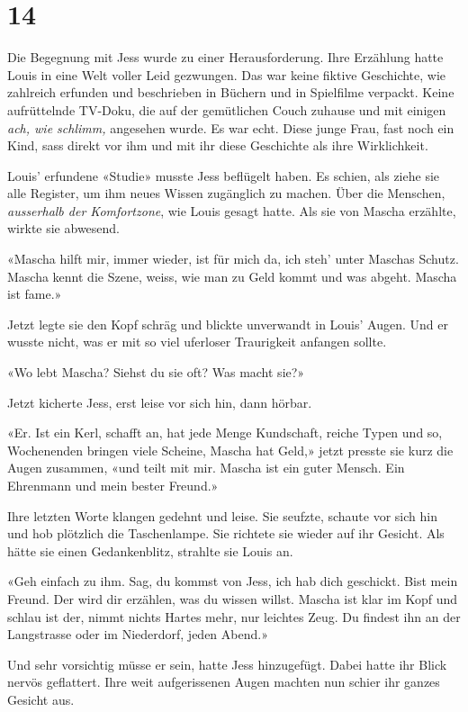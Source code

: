 \chapter{14}



Die Begegnung mit Jess wurde zu einer Herausforderung. Ihre
Erzählung hatte Louis in eine Welt voller Leid gezwungen.
Das war keine fiktive Geschichte, wie zahlreich erfunden und beschrieben
in Büchern und in Spielfilme verpackt. Keine aufrüttelnde TV-Doku, die
auf der gemütlichen Couch zuhause und mit einigen \emph{ach, wie
schlimm,} angesehen wurde. Es war echt. Diese junge Frau, fast noch ein
Kind, sass direkt vor ihm und mit ihr diese Geschichte als ihre Wirklichkeit.

Louis’ erfundene «Studie» musste Jess beflügelt haben. Es schien, als ziehe sie
alle Register, um ihm neues Wissen zugänglich zu machen. Über die
Menschen, \emph{ausserhalb der Komfortzone}, wie Louis gesagt hatte. 
Als sie von Mascha erzählte, wirkte sie abwesend.

«Mascha hilft mir, immer wieder, ist für mich da, ich steh’ unter
Maschas Schutz. Mascha kennt die Szene, weiss, wie man zu Geld kommt und
was abgeht. Mascha ist fame.»

Jetzt legte sie den Kopf schräg und blickte unverwandt in Louis’ Augen.
Und er wusste nicht, was er mit so viel uferloser Traurigkeit anfangen
sollte.

«Wo lebt Mascha? Siehst du sie oft? Was macht sie?»

Jetzt kicherte Jess, erst leise vor sich hin, dann hörbar.

«Er. Ist ein Kerl, schafft an, hat jede Menge
Kundschaft, reiche Typen und so, Wochenenden bringen viele Scheine, Mascha hat
Geld,» jetzt presste sie kurz die Augen zusammen, «und teilt mit mir. Mascha ist ein guter Mensch. 
Ein Ehrenmann und mein bester Freund.»

Ihre letzten Worte klangen gedehnt und leise. Sie seufzte, schaute vor
sich hin und hob plötzlich die Taschenlampe. Sie richtete sie wieder auf ihr
Gesicht. Als hätte sie einen Gedankenblitz, strahlte sie Louis an.

«Geh einfach zu ihm. Sag, du kommst von Jess, ich hab dich geschickt.
Bist mein Freund. Der wird dir erzählen, was du wissen willst. Mascha
ist klar im Kopf und schlau ist der, nimmt nichts Hartes mehr, nur
leichtes Zeug. Du findest ihn an der Langstrasse oder im Niederdorf,
jeden Abend.»

Und sehr vorsichtig müsse er sein, hatte Jess hinzugefügt. Dabei hatte
ihr Blick nervös geflattert. Ihre weit aufgerissenen Augen machten nun
schier ihr ganzes Gesicht aus.

